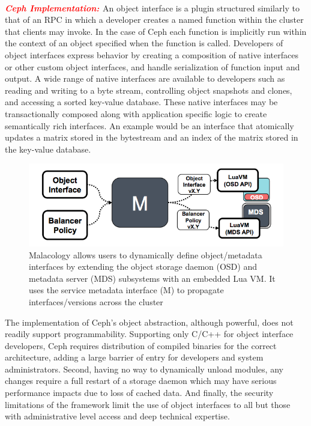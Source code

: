 \documentclass[preprint]{sigplanconf-eurosys}
\newcommand{\newcomment}[1]{{\textcolor{red}{\textbf{#1}}}}
\begin{document}
\newcomment{\\ \noindent\it{\textbf{Ceph Implementation: }}}
An object interface is a plugin structured similarly to that of an RPC
in which a developer creates a named function within the cluster that clients
may invoke. In the case of Ceph each function is implicitly run within the
context of an object specified when the function is called. Developers of
object interfaces express behavior by creating a composition of native
interfaces or other custom object interfaces, and handle serialization of
function input and output.  A wide range of native interfaces are available to
developers such as reading and writing to a byte stream, controlling object
snapshots and clones, and accessing a sorted key-value database. These native
interfaces may be transactionally composed along with application
specific logic to create semantically rich interfaces. An example would be
an interface that atomically updates a matrix stored in the bytestream and an
index of the matrix stored in the key-value database.\\

\begin{figure}[tbp]
\centering
\includegraphics{figures/implementation.png}
\caption{Malacology allows users to dynamically define object/metadata
interfaces by extending the object storage daemon (OSD) and metadata server
(MDS) subsystems with an embedded Lua VM.  It uses the service metadata
interface (M) to propagate interfaces/versions across the cluster
\label{fig:implementation}}
\end{figure}

 The implementation of Ceph's object abstraction,
although powerful, does not readily support programmability. Supporting only
C/C++ for object interface developers, Ceph requires distribution of compiled
binaries for the correct architecture, adding a large barrier of entry for
developers and system administrators. Second, having no way to dynamically
unload modules, any changes require a full restart of a storage daemon which
may have serious performance impacts due to loss of cached data. And finally,
the security limitations of the framework limit the use of object interfaces to
all but those with administrative level access and deep technical expertise.
\end{document}
